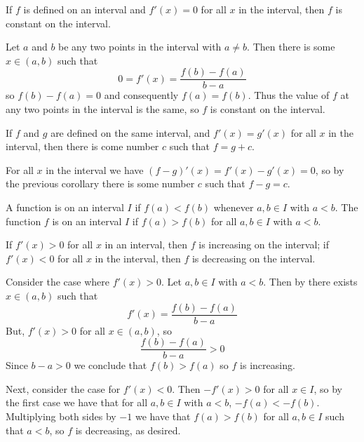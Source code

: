 \documentclass[12pt]{report}
\begin{document}
\begin{cor}{}{}
    If $f$ is defined on an interval and $f'(x) = 0$ for all $x$ in the interval, then $f$ is constant on the interval.
\end{cor}
\begin{proof*}
    Let $a$ and $b$ be any two points in the interval with $a \neq b$. Then there is some $x \in (a,b)$ such that \begin{equation*}
        0 = f'(x) = \frac{f(b) - f(a)}{b-a}
    \end{equation*}
    so $f(b) - f(a) = 0$ and consequently $f(a) = f(b)$. Thus the value of $f$ at any two points in the interval is the same, so $f$ is constant on the interval.
\end{proof*}

\begin{cor}{}{}
    If $f$ and $g$ are defined on the same interval, and $f'(x) = g'(x)$ for all $x$ in the interval, then there is come number $c$ such that $f = g+c$.
\end{cor}
\begin{proof*}{}{}
    For all $x$ in the interval we have $(f-g)'(x) = f'(x) - g'(x) = 0$, so by the previous corollary there is some number $c$ such that $f-g = c$.
\end{proof*}


\begin{defn}{}{}
    A function is  on an interval $I$ if $f(a) < f(b)$ whenever $a,b \in I$ with $a < b$. The function $f$ is  on an interval $I$ if $f(a) > f(b)$ for all $a,b \in I$ with $a < b$.
\end{defn}


\begin{cor}{}{}
    If $f'(x) > 0$ for all $x$ in an interval, then $f$ is increasing on the interval; if $f'(x) < 0$ for all $x$ in the interval, then $f$ is decreasing on the interval.
\end{cor}
\begin{proof*}{}{}
    Consider the case where $f'(x) > 0$. Let $a,b \in I$ with $a < b$. Then by  there exists $x \in (a,b)$ such that \begin{equation*}
        f'(x) = \frac{f(b) - f(a)}{b-a}
    \end{equation*}
    But, $f'(x) > 0$ for all $x \in (a,b)$, so $$\frac{f(b) - f(a)}{b-a} > 0$$
    Since $b-a > 0$ we conclude that $f(b) > f(a)$ so $f$ is increasing.

    Next, consider the case for $f'(x) < 0$. Then $-f'(x) > 0$ for all $x \in I$, so by the first case we have that for all $a,b \in I$ with $a < b$, $-f(a) < -f(b)$. Multiplying both sides by $-1$ we have that $f(a) > f(b)$ for all $a,b \in I$ such that $a < b$, so $f$ is decreasing, as desired.
\end{proof*}
\end{document}

